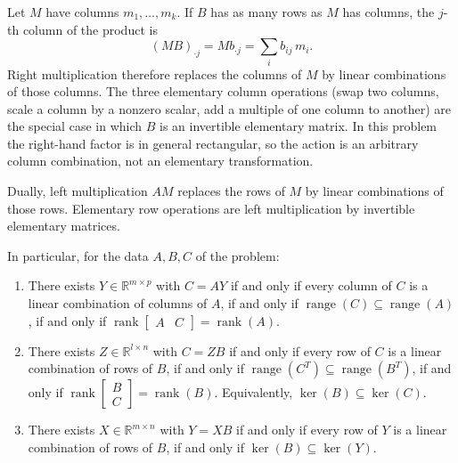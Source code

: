 \documentclass[11pt,a4paper]{article}
\DeclareMathOperator{\rank}{rank}
\begin{document}
\begin{definition}
\label{def:left-right-mult}
Let \(M\) have columns \(m_{1},\ldots,m_{k}\). If \(B\) has as many rows as \(M\) has columns, the \(j\)-th column of the product is
\[
(MB)_{\cdot j}
=
M b_{\cdot j}
=
\sum_{i} b_{ij}\, m_{i}.
\]
Right multiplication therefore replaces the columns of \(M\) by linear combinations of those columns. The three elementary column operations (swap two columns, scale a column by a nonzero scalar, add a multiple of one column to another) are the special case in which \(B\) is an invertible elementary matrix. In this problem the right-hand factor is in general rectangular, so the action is an arbitrary column combination, not an elementary transformation.

Dually, left multiplication \(AM\) replaces the rows of \(M\) by linear combinations of those rows. Elementary row operations are left multiplication by invertible elementary matrices.

In particular, for the data \(A,B,C\) of the problem:
\begin{enumerate}[label=\textup{(\roman*)}]
    \item
    There exists \(Y\in\mathbb{R}^{m\times p}\) with \(C=AY\) if and only if every column of \(C\) is a linear combination of columns of \(A\), if and only if \(\operatorname{range}(C)\subseteq\operatorname{range}(A)\), if and only if \(\rank\begin{bmatrix} A & C \end{bmatrix}=\rank(A)\).

    \item
    There exists \(Z\in\mathbb{R}^{l\times n}\) with \(C=ZB\) if and only if every row of \(C\) is a linear combination of rows of \(B\), if and only if \(\operatorname{range}(C^{T})\subseteq\operatorname{range}(B^{T})\), if and only if \(\rank\begin{bmatrix} B \\ C \end{bmatrix}=\rank(B)\). Equivalently, \(\ker(B)\subseteq\ker(C)\).

    \item
    There exists \(X\in\mathbb{R}^{m\times n}\) with \(Y=XB\) if and only if every row of \(Y\) is a linear combination of rows of \(B\), if and only if \(\ker(B)\subseteq\ker(Y)\).
\end{enumerate}
\end{definition}
\end{document}
